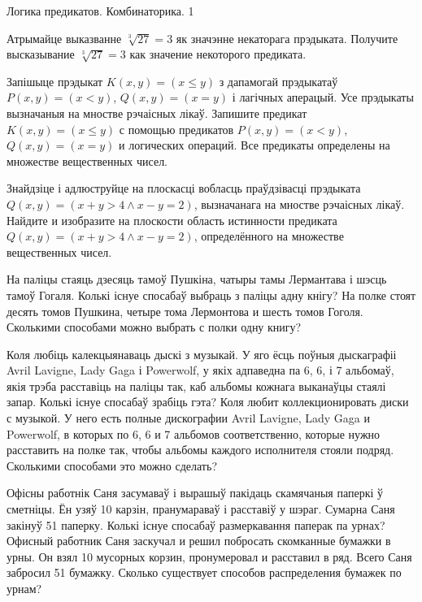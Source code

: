 \documentclass[11pt,twoside]{article}
\begin{document}
{Логика предикатов. Комбинаторика.}
{1}

\begin{problemList}

\problemItemSimple
{Атрымайце выказванне $\sqrt[3]{27} = 3$ як значэнне некаторага прэдыката.}
{Получите высказывание $\sqrt[3]{27} = 3$ как значение некоторого предиката.}

\bigskip

\problemItemSimple
{Запішыце прэдыкат $K(x, y) = (x \le y)$ з дапамогай прэдыкатаў $P(x, y) = (x < y)$, $Q(x, y) = (x = y)$ і лагічных аперацый.
Усе прэдыкаты вызначаныя на мностве рэчаісных лікаў.}
{Запишите предикат $K(x, y) = (x \le y)$ с помощью предикатов $P(x, y) = (x < y)$, $Q(x, y) = (x = y)$ и логических операций.
Все предикаты определены на множестве вещественных чисел.}

\bigskip

\problemItemSimple
{Знайдзіце і адлюструйце на плоскасці вобласць праўдзівасці прэдыката $Q(x, y) = (x + y > 4 \wedge x - y = 2)$, вызначанага на мностве рэчаісных лікаў.}
{Найдите и изобразите на плоскости область истинности предиката $Q(x, y) = (x + y > 4 \wedge x - y = 2)$, определённого на множестве вещественных чисел.}

\bigskip

\problemItemSimple
{На паліцы стаяць дзесяць тамоў Пушкіна, чатыры тамы Лермантава і шэсць тамоў Гогаля.
Колькі існуе спосабаў выбраць з паліцы адну кнігу?}
{На полке стоят десять томов Пушкина, четыре тома Лермонтова и шесть томов Гоголя.
Сколькими способами можно выбрать с полки одну книгу?}

\bigskip

\problemItemSimple
{Коля любіць калекцыянаваць дыскі з музыкай.
У яго ёсць поўныя дыскаграфіі Avril Lavigne, Lady Gaga і Powerwolf, у якіх адпаведна па 6, 6, і 7 альбомаў,
якія трэба расставіць на паліцы так, каб альбомы кожнага выканаўцы стаялі запар.
Колькі існуе спосабаў зрабіць гэта?}
{Коля любит коллекционировать диски с музыкой.
У него есть полные дискографии Avril Lavigne, Lady Gaga и Powerwolf, в которых по 6, 6 и 7 альбомов соответственно,
которые нужно расставить на полке так, чтобы альбомы каждого исполнителя стояли подряд.
Сколькими способами это можно сделать?}

\bigskip

\problemItemSimple
{Офісны работнік Саня засумаваў і вырашыў пакідаць скамячаныя паперкі ў сметніцы.
Ён узяў 10 карзін, пранумараваў і расставіў у шэраг.
Сумарна Саня закінуў 51 паперку. Колькі існуе спосабаў размеркавання паперак па урнах?}
{Офисный работник Саня заскучал и решил побросать скомканные бумажки в урны.
Он взял 10 мусорных корзин, пронумеровал и расставил в ряд.
Всего Саня забросил 51 бумажку. Сколько существует способов распределения бумажек по урнам?}


\end{problemList}
\end{document}
